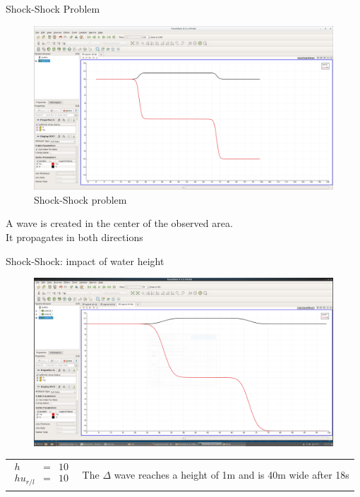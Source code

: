 \documentclass[shortpres]{beamer}
\newcommand{\imgvoffset}{-20pt}
\newcommand{\imgfullscale}{0.75}
\begin{document}
\begin{frame}{Shock-Shock Problem}
	\begin{figure}[t]
		\vspace{\imgvoffset}
		\includegraphics[clip, width=\imgfullscale\linewidth]{img/Shock-Shock.png}
		\caption*{Shock-Shock problem}
	\end{figure}
	\centering
	A wave is created in the center of the observed area.\\
	It propagates in both directions
\end{frame}


\begin{frame}{Shock-Shock: impact of water height}
	\begin{figure}[t]
		\vspace{\imgvoffset}
		\includegraphics[width=\imgfullscale\linewidth]{img/Shock_h10_t18.png}
		\caption*{}
	\end{figure}
	
	\begin{tabular}{m{3cm} m{\linewidth-5cm}}
		$
		\begin{matrix}
		h & = & 10\\
		hu_{r/l} & = & 10
		\end{matrix}
		$
		&
		
		The $\Delta$ wave reaches a height of 1m and is 40m wide after 18s
	\end{tabular}
\end{frame}
\end{document}
